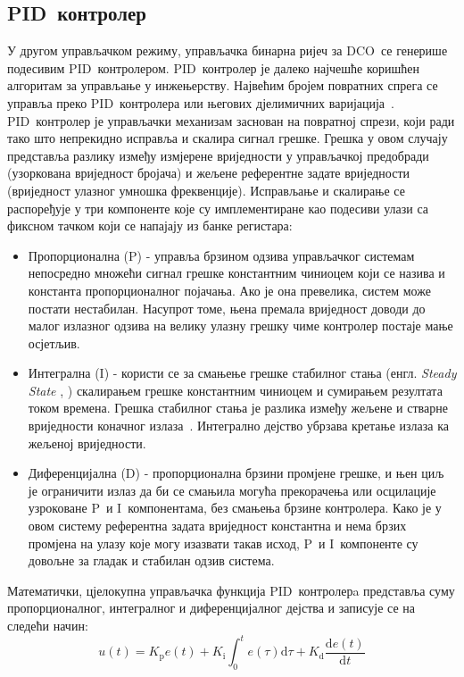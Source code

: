 \documentclass[master]{finthesis}
\makeatletter
\newcommand*{\engl}[2][\@empty]{%
    \edef\theacronym{#1}%
    (енгл. \foreignlanguage{english}{\emph{#2}%
    \ifx\theacronym\@empty \else , #1\fi})%
}
\def \DCO  {DCO} %
\def \PID  {PID} %
\def \P    {P}   %
\def \I    {I}   %
\def \D    {D}   %
\makeatother
\begin{document}
\subsection{\PID\ контролер} \label{section:pid}
У другом управљачком режиму, управљачка бинарна ријеч за \DCO\ се генерише подесивим \PID\ контролером. \PID\ контролер је далеко најчешће коришћен алгоритам за управљање у инжењерству. Највећим бројем повратних спрега се управља преко \PID\ контролера или његових дјелимичних варијација~\cite{Astrom:PID_1995}. \PID\ контролер је управљачки механизам заснован на повратној спрези, који ради тако што непрекидно исправља и скалира сигнал грешке. Грешка у овом случају представља разлику између измјерене вриједности у управљачкој предобради (узоркована вриједност бројача) и жељене референтне задате вриједности (вриједност улазног умношка фреквенције). Исправљање и скалирање се распоређује у три компоненте које су имплементиране као подесиви улази са фиксном тачком који се напајају из банке регистара: 
\begin{itemize}
	\item Пропорционална (\P) - управља брзином одзива управљачког системам непосредно множећи сигнал грешке константним чиниоцем који се назива и константа пропорционалног појачања. Ако је она превелика, систем може постати нестабилан. Насупрот томе, њена премала вриједност доводи до малог излазног одзива на велику улазну грешку чиме контролер постаје мање осјетљив. 
	\item Интегрална (\I) - користи се за смањење грешке стабилног стања \engl{Steady State} скалирањем грешке константним чиниоцем и сумирањем резултата током времена. Грешка стабилног стања је разлика између жељене и стварне вриједности коначног излаза~\cite{Liptak:PROCESS_CONTROL_2006}. Интегрално дејство убрзава кретање излаза ка жељеној вриједности.
	\item Диференцијална (\D) - пропорционална брзини промјене грешке, и њен циљ је ограничити излаз да би се смањила могућа прекорачења или осцилације узроковане \P\ и \I\ компонентама, без смањења брзине контролера. Како је у овом систему референтна задата вриједност константна и нема брзих промјена на улазу које могу изазвати такав исход, \P\ и \I\ компоненте су довољне за гладак и стабилан одзив система. \par
\end{itemize}
Математички, цјелокупна управљачка функција \PID\ контролерa представља суму пропорционалног, интегралног и диференцијалног дејства и записује се на следећи начин:
\begin{equation} 
	\label{eq_pid_1}
	u(t)= K_\text{p}e(t) + K_\text{i}\int_{0}^{t}e(\tau)\text{d}\tau + K_\text{d}\frac{\text{d}e(t)}{\text{d}t}
\end{equation}
\end{document}
